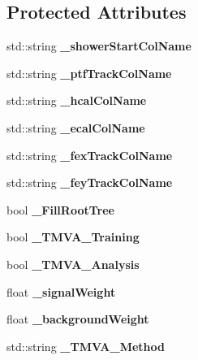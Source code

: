 \subsection*{Protected Attributes}
\begin{DoxyCompactItemize}
\item 
std\-::string {\bfseries \-\_\-shower\-Start\-Col\-Name}\label{classHcalTMVAProcessor_a828711ef10b4b4556e1650148fdddb56}

\item 
std\-::string {\bfseries \-\_\-ptf\-Track\-Col\-Name}\label{classHcalTMVAProcessor_a866284ca5765034888614bf32ee3a8b5}

\item 
std\-::string {\bfseries \-\_\-hcal\-Col\-Name}\label{classHcalTMVAProcessor_ab91c0aefa8371bb9fea28884413572cf}

\item 
std\-::string {\bfseries \-\_\-ecal\-Col\-Name}\label{classHcalTMVAProcessor_aaf7d811967d03a8b61bd5ca589a0b6a5}

\item 
std\-::string {\bfseries \-\_\-fex\-Track\-Col\-Name}\label{classHcalTMVAProcessor_aa52a884dc3d852f83dd10c0db7b666fe}

\item 
std\-::string {\bfseries \-\_\-fey\-Track\-Col\-Name}\label{classHcalTMVAProcessor_acf4b95a70aa0818757a9dabb70d911dc}

\item 
bool {\bfseries \-\_\-\-Fill\-Root\-Tree}\label{classHcalTMVAProcessor_a9869466d9a7ab2657b00ac02bcda13d4}

\item 
bool {\bfseries \-\_\-\-T\-M\-V\-A\-\_\-\-Training}\label{classHcalTMVAProcessor_a0c790893fd157dd495ed4bd2f7e599a5}

\item 
bool {\bfseries \-\_\-\-T\-M\-V\-A\-\_\-\-Analysis}\label{classHcalTMVAProcessor_a5c0440c4c0f66f41bb5b6a9d21395f11}

\item 
float {\bfseries \-\_\-signal\-Weight}\label{classHcalTMVAProcessor_a8878e5e96b8cf447eb762ff4046ae402}

\item 
float {\bfseries \-\_\-background\-Weight}\label{classHcalTMVAProcessor_a7c44771323a9a99aa8ce5bd9a3c495a4}

\item 
std\-::string {\bfseries \-\_\-\-T\-M\-V\-A\-\_\-\-Method}\label{classHcalTMVAProcessor_a29578e096e86d3f96bb45d235d15323d}


\end{DoxyCompactItemize}
